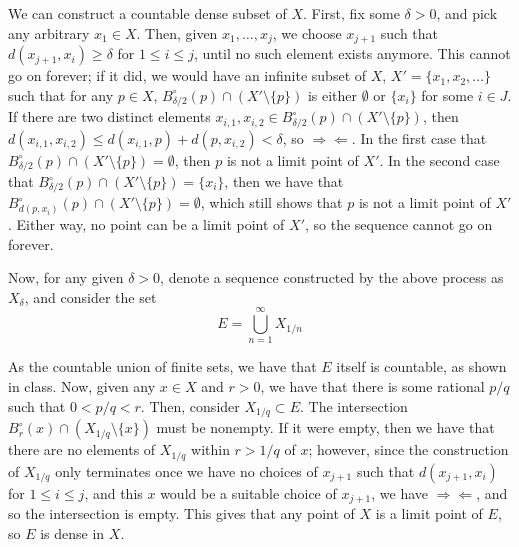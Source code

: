 \documentclass[12pt,letterpaper]{article}
\theoremstyle{definition}
\newcommand{\contra}{\Rightarrow\!\Leftarrow}
\begin{document}
We can construct a countable dense subset of $X$. First, fix some $\delta > 0$, and pick any arbitrary $x_{1} \in X$. Then, given $x_{1}, \dots, x_{j}$, we choose $x_{j+1}$ such that $d(x_{j+1}, x_{i}) \geq \delta$ for $1 \leq i \leq j$, until no such element exists anymore. This cannot go on forever; if it did, we would have an infinite subset of $X$, $X' = \{x_{1}, x_{2}, \dots \}$ such that for any $p \in X$, $B_{\delta / 2}^{\circ} (p) \cap (X' \setminus \{ p \})$ is either $\emptyset$ or $\{x_{i}\}$ for some $i \in J$. If there are two distinct elements $x_{i,1}, x_{i,2} \in B_{\delta / 2}^{\circ} (p) \cap (X' \setminus \{ p \})$, then $d(x_{i,1}, x_{i,2}) \leq d(x_{i,1}, p) + d(p, x_{i,2}) < \delta$, so $\contra$. In the first case that $B_{\delta / 2}^{\circ} (p) \cap (X' \setminus \{ p \}) = \emptyset$, then $p$ is not a limit point of $X'$. In the second case that $B_{\delta / 2}^{\circ} (p) \cap (X' \setminus \{ p \}) = \{x_{i}\}$, then we have that $B_{d(p, x_{i})}^{\circ} (p) \cap (X' \setminus \{ p \}) = \emptyset$, which still shows that $p$ is not a limit point of $X'$. Either way, no point can be a limit point of $X'$, so the sequence cannot go on forever.

Now, for any given $\delta > 0$, denote a sequence constructed by the above process as $X_{\delta}$, and consider the set
\[
  E = \bigcup_{n=1}^{\infty} X_{1/n}
\]

As the countable union of finite sets, we have that $E$ itself is countable, as shown in class. Now, given any $x \in X$ and $r > 0$, we have that there is some rational $p / q$ such that $0 < p / q < r$. Then, consider $X_{1/q} \subset E$. The intersection $B_{r}^{\circ}(x) \cap (X_{1/q} \setminus \{x\})$ must be nonempty. If it were empty, then we have that there are no elements of $X_{1/q}$ within $r > 1/q$ of $x$; however, since the construction of $X_{1/q}$ only terminates once we have no choices of $x_{j+1}$ such that $d(x_{j+1}, x_{i})$ for $1 \leq i \leq j$, and this $x$ would be a suitable choice of $x_{j+1}$, we have $\contra$, and so the intersection is empty. This gives that any point of $X$ is a limit point of $E$, so $E$ is dense in $X$.
\end{document}
